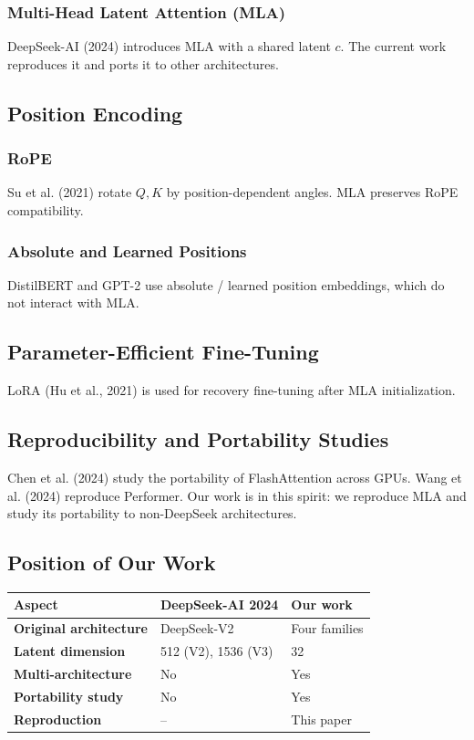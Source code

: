 \subsubsection{Multi-Head Latent Attention (MLA)}

DeepSeek-AI (2024) introduces MLA with a shared latent $c$. The current 
work reproduces it and ports it to other architectures.

\subsection{Position Encoding}

\subsubsection{RoPE}

Su et al. (2021) rotate $Q, K$ by position-dependent angles. MLA preserves 
RoPE compatibility.

\subsubsection{Absolute and Learned Positions}

DistilBERT and GPT-2 use absolute / learned position embeddings, which do 
not interact with MLA.

\subsection{Parameter-Efficient Fine-Tuning}

LoRA (Hu et al., 2021) is used for recovery fine-tuning after MLA 
initialization.

\subsection{Reproducibility and Portability Studies}

Chen et al. (2024) study the portability of FlashAttention across GPUs. 
Wang et al. (2024) reproduce Performer. Our work is in this spirit: we 
reproduce MLA and study its portability to non-DeepSeek architectures.

\subsection{Position of Our Work}

\begin{table}[H]
\centering
\small
\begin{tabular}{lll}
\toprule
\textbf{Aspect} & \textbf{DeepSeek-AI 2024} & \textbf{Our work} \\
\midrule
\textbf{Original architecture} & DeepSeek-V2 & Four families \\
\textbf{Latent dimension} & 512 (V2), 1536 (V3) & 32 \\
\textbf{Multi-architecture} & No & Yes \\
\textbf{Portability study} & No & Yes \\
\textbf{Reproduction} & -- & This paper \\
\bottomrule
\end{tabular}
\end{table}

